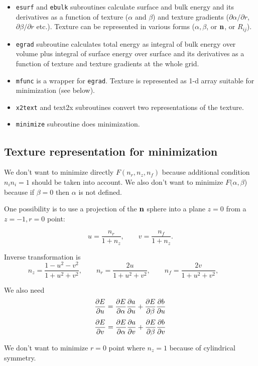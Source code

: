 \documentclass[a4paper]{article}
\begin{document}
\begin{itemize}
\item {\tt esurf} and {\tt ebulk} subroutines calculate surface and
bulk energy and its derivatives as a function of texture ($\alpha$ and
$\beta$) and texture gradients ($\partial\alpha/\partial r$,
$\partial\beta/\partial r$ etc.). Texture can be represented in various
forms ($\alpha, \beta$, or $\bf n$, or $R_{ij}$).

\item {\tt egrad} subroutine calculates total energy as integral of bulk energy over volume
plus integral of surface energy over surface and its derivatives as a
function of texture and texture gradients at the whole grid.

\item {\tt mfunc} is a wrapper for {\tt egrad}. Texture is represented
as 1-d array suitable for minimization (see below).

\item {\tt x2text} and {text2x} subroutines convert two representations of the texture.

\item {\tt minimize} subroutine does minimization.
\end{itemize}



\subsection*{Texture representation for minimization}

We don't want to minimize directly $F(n_r, n_z, n_f)$ because additional
condition $n_i n_i = 1$ should be taken into account. We also don't want
to minimize $F(\alpha, \beta$) because if $\beta=0$ then $\alpha$
is not defined.

One possibility is to use a projection of the $\bf n$ sphere into a plane
$z=0$ from a $z=-1, r=0$ point:

$$
u=\frac{n_r}{1+n_z}, \qquad  v=\frac{n_f}{1+n_z}.
$$

Inverse transformation is
$$
n_z = \frac{1-u^2-v^2}{1+u^2+v^2},\qquad
n_r = \frac{2u}{1+u^2+v^2},\qquad
n_f = \frac{2v}{1+u^2+v^2},\qquad
$$

We also need
$$
\frac{\partial E}{\partial u} = \frac{\partial E}{\partial \alpha}\frac{\partial a}{\partial u} + \frac{\partial E}{\partial \beta}\frac{\partial b}{\partial u}
$$
$$
\frac{\partial E}{\partial v} = \frac{\partial E}{\partial \alpha}\frac{\partial a}{\partial v} + \frac{\partial E}{\partial \beta}\frac{\partial b}{\partial v}
$$

We don't want to minimize $r=0$ point where $n_z=1$ because of cylindrical symmetry.
\end{document}
